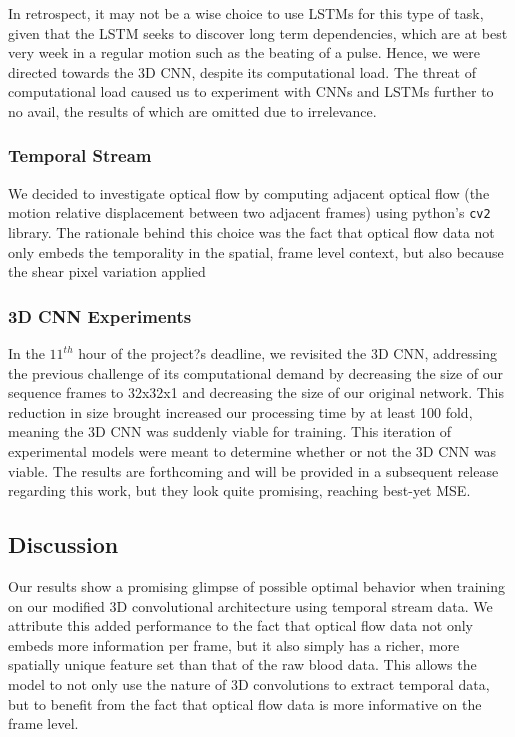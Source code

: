 \documentclass{article}
\begin{document}
In retrospect, it may not be a wise choice to use LSTMs for this type of task, given that the LSTM seeks to discover long term dependencies, which are at best very week in a regular motion such as the beating of a pulse. Hence, we were directed towards the 3D CNN, despite its computational load. The threat of computational load caused us to experiment with CNNs and LSTMs further to no avail, the results of which are omitted due to irrelevance.
\subsubsection[3.2.3]{Temporal Stream}
We decided to investigate optical flow by computing adjacent optical flow (the motion relative displacement between two adjacent frames) using python's \texttt{cv2} library. The rationale behind this choice was the fact that optical flow data not only embeds the temporality in the spatial, frame level context, but also because the shear pixel variation applied 
\subsubsection[3.2.4]{3D CNN Experiments}
In the $11^{th}$ hour of the project?s deadline, we revisited the 3D CNN, addressing the previous challenge of its computational demand by decreasing the size of our sequence frames to 32x32x1 and decreasing the size of our original network. This reduction in size brought increased our processing time by at least 100 fold, meaning the 3D CNN was suddenly viable for training. This iteration of experimental models were meant to determine whether or not the 3D CNN was viable. The results are forthcoming and will be provided in a subsequent release regarding this work, but they look quite promising, reaching best-yet MSE.
\subsection[3.3] {Discussion}
Our results show a promising glimpse of possible optimal behavior when training on our modified 3D convolutional architecture using temporal stream data. We attribute this added performance to the fact that optical flow data not only embeds more information per frame, but it also simply has a richer, more spatially unique feature set than that of the raw blood data. This allows the model to not only use the nature of 3D convolutions to extract temporal data, but to benefit from the fact that optical flow data is more informative on the frame level.
\end{document}
